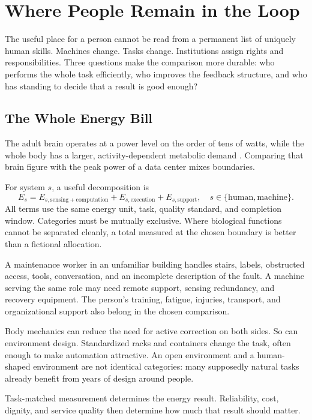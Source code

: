 \documentclass[11pt,openany]{book}
\begin{document}
\section{Where People Remain in the Loop}

The useful place for a person cannot be read from a permanent list of uniquely human skills. Machines change. Tasks change. Institutions assign rights and responsibilities. Three questions make the comparison more durable: who performs the whole task efficiently, who improves the feedback structure, and who has standing to decide that a result is good enough?

\subsection{The Whole Energy Bill}

The adult brain operates at a power level on the order of tens of watts, while the whole body has a larger, activity-dependent metabolic demand \cite{smil2015power}. Comparing that brain figure with the peak power of a data center mixes boundaries.

For system $s$, a useful decomposition is
\begin{equation}
 E_s=E_{s,\mathrm{sensing+computation}}
     +E_{s,\mathrm{execution}}
     +E_{s,\mathrm{support}},
 \quad s\in\{\mathrm{human},\mathrm{machine}\}.
\end{equation}
All terms use the same energy unit, task, quality standard, and completion window. Categories must be mutually exclusive. Where biological functions cannot be separated cleanly, a total measured at the chosen boundary is better than a fictional allocation.

A maintenance worker in an unfamiliar building handles stairs, labels, obstructed access, tools, conversation, and an incomplete description of the fault. A machine serving the same role may need remote support, sensing redundancy, and recovery equipment. The person's training, fatigue, injuries, transport, and organizational support also belong in the chosen comparison.

Body mechanics can reduce the need for active correction on both sides. So can environment design. Standardized racks and containers change the task, often enough to make automation attractive. An open environment and a human-shaped environment are not identical categories: many supposedly natural tasks already benefit from years of design around people.

Task-matched measurement determines the energy result. Reliability, cost, dignity, and service quality then determine how much that result should matter.
\end{document}
